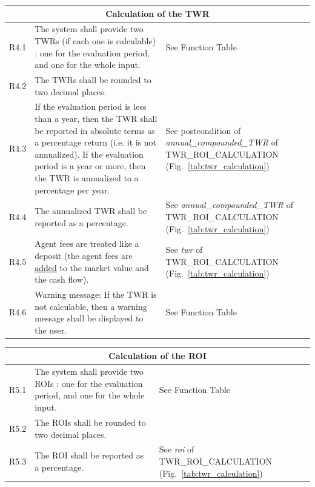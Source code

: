 \documentclass[runningheads,12pt]{article}
\begin{document}
{\begin{longtable}{|l|p{9cm}|p{5cm}|}
\hline
\multicolumn{3}{|c|}{\textbf{Calculation of the TWR}} \\

\hline
R4.1 & The system shall provide two TWRs (if each one is calculable) : one for the evaluation period, and one for the whole input. & See Function Table \\

\hline
R4.2 &  The TWRs shall be rounded to two decimal places. & \\

\hline
R4.3 & If the evaluation period is less than a year, then the TWR shall be reported in absolute terms as a percentage return (i.e. it is not annualized). If the evaluation period is a year or more, then the TWR is annualized to a percentage per year. & See postcondition of  \textit{annual\_compounded\_TWR} of TWR\_ROI\_CALCULATION (Fig.~\ref{tab:twr_calculation})\\

\hline
R4.4 & The annualized TWR shall be reported as a percentage. & See \textit{annual\_compounded\_TWR} of TWR\_ROI\_CALCULATION (Fig.~\ref{tab:twr_calculation})\\

\hline
R4.5 & Agent fees are treated like a deposit (the agent fees are \underline{added} to the market value and the cash flow). & See \textit{twr} of TWR\_ROI\_CALCULATION (Fig.~\ref{tab:twr_calculation})\\

\hline
R4.6 & Warning message: If the TWR is not calculable, then a warning message shall be displayed to the user. & See Function Table\\

\hline
\end{longtable}
\centering
\begin{longtable}{|l|p{9cm}|p{5cm}|}

\hline
\multicolumn{3}{|c|}{\textbf{Calculation of the ROI}} \\

\hline
R5.1 & The system shall provide two ROIs : one for the evaluation period, and one for the whole input. & See Function Table\\

\hline
R5.2 &  The ROIs shall be rounded to two decimal places. & \\

\hline
R5.3 & The ROI shall be reported as a percentage. & See \textit{roi} of TWR\_ROI\_CALCULATION (Fig.~\ref{tab:twr_calculation})\\


\end{longtable}}
\end{document}
